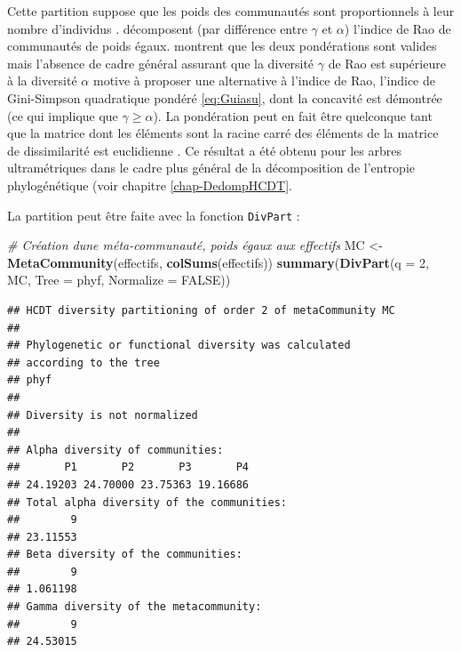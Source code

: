 \documentclass[
  11pt,
  french,
  a4paper,
  extrafontsizes,onecolumn,openright
  ]{memoir}
\newenvironment{Shaded}{\begin{snugshade}}{\end{snugshade}}
\newcommand{\AttributeTok}[1]{\textcolor[rgb]{0.13,0.29,0.53}{#1}}
\newcommand{\CommentTok}[1]{\textcolor[rgb]{0.56,0.35,0.01}{\textit{#1}}}
\newcommand{\ConstantTok}[1]{\textcolor[rgb]{0.56,0.35,0.01}{#1}}
\newcommand{\DecValTok}[1]{\textcolor[rgb]{0.00,0.00,0.81}{#1}}
\newcommand{\FunctionTok}[1]{\textcolor[rgb]{0.13,0.29,0.53}{\textbf{#1}}}
\newcommand{\NormalTok}[1]{#1}
\newcommand{\OtherTok}[1]{\textcolor[rgb]{0.56,0.35,0.01}{#1}}
\begin{document}
Cette partition suppose que les poids des communautés sont proportionnels à leur nombre d'individus \autocite{Rao1982,Villeger2008}.
\textcite{Hardy2007} décomposent (par différence entre \(\gamma\) et \(\alpha\)) l'indice de Rao de communautés de poids égaux.
\textcite{Hardy2008} montrent que les deux pondérations sont valides mais l'absence de cadre général assurant que la diversité \(\gamma\) de Rao est supérieure à la diversité \(\alpha\) \autocite{DeBello2010} motive \textcite{Guiasu2011} à proposer une alternative à l'indice de Rao, l'indice de Gini-Simpson quadratique pondéré \eqref{eq:Guiasu}, dont la concavité est démontrée (ce qui implique que \(\gamma\ge \alpha\)).
La pondération peut en fait être quelconque tant que la matrice dont les éléments sont la racine carré des éléments de la matrice de dissimilarité est euclidienne \autocite{Champely2002}.
Ce résultat a été obtenu pour les arbres ultramétriques dans le cadre plus général de la décomposition de l'entropie phylogénétique (voir chapitre \ref{chap-DedompHCDT}.

La partition peut être faite avec la fonction \texttt{DivPart} :

\scriptsize

\begin{Shaded}
\begin{Highlighting}[]
\CommentTok{\# Création d\textquotesingle{}une méta{-}communauté, poids égaux aux effectifs}
\NormalTok{MC }\OtherTok{\textless{}{-}} \FunctionTok{MetaCommunity}\NormalTok{(effectifs, }\FunctionTok{colSums}\NormalTok{(effectifs))}
\FunctionTok{summary}\NormalTok{(}\FunctionTok{DivPart}\NormalTok{(}\AttributeTok{q =} \DecValTok{2}\NormalTok{, MC, }\AttributeTok{Tree =}\NormalTok{ phyf, }\AttributeTok{Normalize =} \ConstantTok{FALSE}\NormalTok{))}
\end{Highlighting}
\end{Shaded}

\begin{verbatim}
## HCDT diversity partitioning of order 2 of metaCommunity MC
## 
## Phylogenetic or functional diversity was calculated
## according to the tree 
## phyf 
## 
## Diversity is not normalized 
## 
## Alpha diversity of communities: 
##       P1       P2       P3       P4 
## 24.19203 24.70000 23.75363 19.16686 
## Total alpha diversity of the communities: 
##        9 
## 23.11553 
## Beta diversity of the communities: 
##        9 
## 1.061198 
## Gamma diversity of the metacommunity: 
##        9 
## 24.53015
\end{verbatim}
\end{document}

